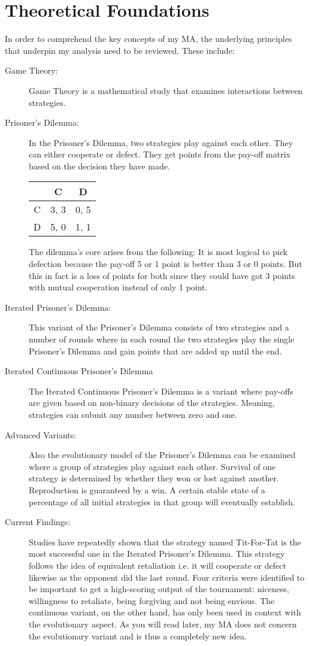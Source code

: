 \documentclass{article}
\begin{document}
\section{Theoretical Foundations}
	In order to comprehend the key concepts of my MA, the underlying principles that underpin my analysis need to be reviewed. These include:
	\begin{description}
		\item[Game Theory:] Game Theory is a mathematical study that examines interactions between strategies.
		\item[Prisoner's Dilemma:] In the Prisoner's Dilemma, two strategies play against each other. They can either cooperate or defect. They get points from the pay-off matrix based on the decision they have made.

\begin{center}
\begin{tabular}{ c|c|c }
   & C & D \\ 
   \hline
C & 3, 3 & 0, 5\\  
   \hline
 D & 5, 0 & 1, 1
\end{tabular}
\end{center}

The dilemma's core arises from the following: It is most logical to pick defection because the pay-off 5 or 1 point is better than 3 or 0 points. But this in fact is a loss of points for both since they could have got 3 points with mutual cooperation instead of only 1 point. 
		\item[Iterated Prisoner's Dilemma:] This variant of the Prisoner's Dilemma consists of two strategies and a number of rounds where in each round the two strategies play the single Prisoner's Dilemma and gain points that are added up until the end.
		\item[Iterated Continuous Prisoner's Dilemma] The Iterated Continuous Prisoner's Dilemma is a variant where pay-offs are given based on non-binary decisions of the strategies. Meaning, strategies can submit any number between zero and one.
		\item[Advanced Variants:]
Also the evolutionary model of the Prisoner's Dilemma can be examined where a group of strategies play against each other. Survival of one strategy is determined by whether they won or lost against another. Reproduction is guaranteed by a win. A certain stable state of a percentage of all initial strategies in that group will eventually establish.
		\item[Current Findings:] Studies have repeatedly shown that the strategy named Tit-For-Tat is the most successful one in the Iterated Prisoner's Dilemma. This strategy follows the idea of equivalent retaliation i.e. it will cooperate or defect likewise as the opponent did the last round. Four criteria were identified to be important to get a high-scoring output of the tournament: niceness, willingness to retaliate, being forgiving and not being envious. The continuous variant, on the other hand, has only been used in context with the evolutionary aspect. As you will read later, my MA does not concern the evolutionary variant and is thus a completely new idea.
	\end{description}
\end{document}
